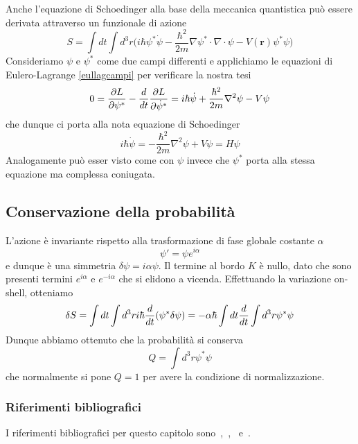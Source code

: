     Anche l'equazione di Schoedinger alla base della meccanica quantistica può essere derivata attraverso un funzionale di azione 
\begin{equation*}
    S = \int dt \int d^3 r \Big( i \hbar \psi^* \dot \psi - \frac{\hbar^2}{2m} \nabla \psi^* \cdot \nabla \cdot \psi - V(\mathbf r) \psi^* \psi \Big)
\end{equation*}
    Consideriamo $\psi$ e $\psi^*$ come due campi differenti e applichiamo le equazioni di Eulero-Lagrange \eqref{eullagcampi} per verificare la nostra tesi 
\begin{equation*}
    0 = \frac{\partial L}{\partial\psi^*} - \frac{d}{dt} \frac{\partial L}{\partial\dot \psi^*} = i \hbar \dot \psi + \frac{\hbar^2}{2m} \nabla^2 \psi - V \psi 
\end{equation*}
    che dunque ci porta alla nota equazione di Schoedinger
\begin{equation*}
    i \hbar \dot \psi = - \frac{\hbar^2}{2m} \nabla^2 \psi + V \psi = H \psi
\end{equation*}
    Analogamente può esser visto come con $\psi$ invece che $\psi^*$ porta alla stessa equazione ma complessa coniugata. 

\subsection{Conservazione della probabilità}

    L'azione è invariante rispetto alla trasformazione di fase globale costante $\alpha$
\begin{equation*}
    \psi' = \psi e^{i\alpha}
\end{equation*}
    e dunque è una simmetria $\delta \psi = i \alpha \psi$. Il termine al bordo $K$ è nullo, dato che sono presenti termini $e^{i\alpha}$ e $e^{-i\alpha}$ che si elidono a vicenda. Effettuando la variazione on-shell, otteniamo 
\begin{equation*}
    \delta S = \int dt \int d^3 r i \hbar \frac{d}{dt} (\psi^* \delta \psi) = - \alpha \hbar \int dt \frac{d}{dt} \int d^3 r \psi^* \psi
\end{equation*}
    Dunque abbiamo ottenuto che la probabilità si conserva 
\begin{equation*}
    Q = \int d^3 r \psi^* \psi
\end{equation*}
    che normalmente si pone $Q = 1$ per avere la condizione di normalizzazione. 

\subsubsection{Riferimenti bibliografici}
    I riferimenti bibliografici per questo capitolo sono~\cite{landaucampi},~\cite{barone},~\cite{banados} e~\cite{weinberg}.
